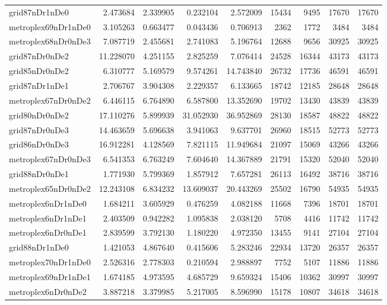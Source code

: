 \begin{longtable}{|l|r|r|r|r|r|r|r|r|}
grid87nDr1nDe0 & 2.473684 & 2.339905 & 0.232104 & 2.572009 & 15434 & 9495 & 17670 & 17670 \\
metroplex69nDr1nDe0 & 3.105263 & 0.663477 & 0.043436 & 0.706913 & 2362 & 1772 & 3484 & 3484 \\
metroplex68nDr0nDe3 & 7.087719 & 2.455681 & 2.741083 & 5.196764 & 12688 & 9656 & 30925 & 30925 \\
grid87nDr0nDe2 & 11.228070 & 4.251155 & 2.825259 & 7.076414 & 24528 & 16344 & 43173 & 43173 \\
grid85nDr0nDe2 & 6.310777 & 5.169579 & 9.574261 & 14.743840 & 26732 & 17736 & 46591 & 46591 \\
grid87nDr1nDe1 & 2.706767 & 3.904308 & 2.229357 & 6.133665 & 18742 & 12185 & 28648 & 28648 \\
metroplex67nDr0nDe2 & 6.446115 & 6.764890 & 6.587800 & 13.352690 & 19702 & 13430 & 43839 & 43839 \\
grid80nDr0nDe2 & 17.110276 & 5.899939 & 31.052930 & 36.952869 & 28130 & 18587 & 48822 & 48822 \\
grid87nDr0nDe3 & 14.463659 & 5.696638 & 3.941063 & 9.637701 & 26960 & 18515 & 52773 & 52773 \\
grid86nDr0nDe3 & 16.912281 & 4.128569 & 7.821115 & 11.949684 & 21097 & 15069 & 43266 & 43266 \\
metroplex67nDr0nDe3 & 6.541353 & 6.763249 & 7.604640 & 14.367889 & 21791 & 15320 & 52040 & 52040 \\
grid88nDr0nDe1 & 1.771930 & 5.799369 & 1.857912 & 7.657281 & 26113 & 16492 & 38716 & 38716 \\
metroplex65nDr0nDe2 & 12.243108 & 6.834232 & 13.609037 & 20.443269 & 25502 & 16790 & 54935 & 54935 \\
metroplex6nDr1nDe0 & 1.684211 & 3.605929 & 0.476259 & 4.082188 & 11668 & 7396 & 18701 & 18701 \\
metroplex6nDr1nDe1 & 2.403509 & 0.942282 & 1.095838 & 2.038120 & 5708 & 4416 & 11742 & 11742 \\
metroplex6nDr0nDe1 & 2.839599 & 3.792130 & 1.180220 & 4.972350 & 13455 & 9141 & 27104 & 27104 \\
grid88nDr1nDe0 & 1.421053 & 4.867640 & 0.415606 & 5.283246 & 22934 & 13720 & 26357 & 26357 \\
metroplex70nDr1nDe0 & 2.526316 & 2.778303 & 0.210594 & 2.988897 & 7752 & 5107 & 11886 & 11886 \\
metroplex69nDr1nDe1 & 1.674185 & 4.973595 & 4.685729 & 9.659324 & 15406 & 10362 & 30997 & 30997 \\
metroplex6nDr0nDe2 & 3.887218 & 3.379985 & 5.217005 & 8.596990 & 15178 & 10807 & 34618 & 34618 \\

\end{longtable}

